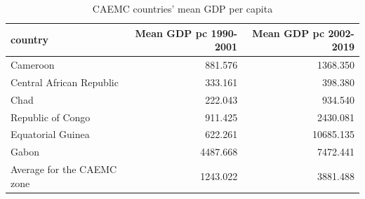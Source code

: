 \begin{table}

\caption{CAEMC countries' mean GDP per capita}
\centering
\begin{tabular}[t]{lrr}
\toprule
country & Mean GDP pc 1990-2001 & Mean GDP pc 2002-2019\\
\midrule
Cameroon & 881.576 & 1368.350\\
Central African Republic & 333.161 & 398.380\\
Chad & 222.043 & 934.540\\
Republic of Congo & 911.425 & 2430.081\\
Equatorial Guinea & 622.261 & 10685.135\\
\addlinespace
Gabon & 4487.668 & 7472.441\\
Average for the CAEMC zone & 1243.022 & 3881.488\\
\bottomrule
\end{tabular}
\end{table}